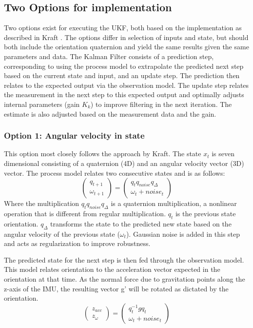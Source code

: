 \documentclass[letterpaper, 10 pt, conference]{ieeeconf}  %
\begin{document}
\subsection{Two Options for implementation}
Two options exist for executing the UKF, both based on the implementation as described in Kraft \cite{c1}. The options differ in selection of inputs and state, but should both include the orientation quaternion and yield the same results given the same parameters and data. The Kalman Filter consists of a prediction step, corresponding to using the process model to extrapolate the predicted next step based on the current state and input, and an update step. The prediction then relates to the expected output via the observation model. The update step relates the measurement in the next step to this expected output and optimally adjusts internal parameters (gain $K_k$) to improve filtering in the next iteration. The estimate is also adjusted based on the measurement data and the gain.

\subsubsection{Option 1: Angular velocity in state}
This option most closely follows the approach by Kraft. The state $x_t$ is seven dimensional consisting of a quaternion (4D) and an angular velocity vector (3D) vector. The process model relates two consecutive states and is as follows:
$$
\begin{pmatrix}
q_{t+1} \\
\omega_{t+1}
\end{pmatrix}
=
\begin{pmatrix}
q_t q_{noise} q_{\Delta} \\
\omega_t + noise_t
\end{pmatrix}
$$
Where the multiplication $q_t q_{noise} q_{\Delta}$ is a quaternion multiplication, a nonlinear operation that is different from regular multiplication. $q_t$ is the previous state orientation. $q_{\Delta}$ transforms the state to the predicted new state based on the angular velocity of the previous state ($\omega_t$). Gaussian noise is added in this step and acts as regularization to improve robustness. 

The predicted state for the next step is then fed through the observation model. This model relates orientation to the acceleration vector expected in the orientation at that time. As the normal force due to gravitation points along the z-axis of the IMU, the resulting vector g' will be rotated as dictated by the orientation. 
$$
\begin{pmatrix}
z_{acc} \\
z_{\omega}
\end{pmatrix}
=
\begin{pmatrix}
q_t^{-1} g q_t \\
\omega_t + noise_t
\end{pmatrix}
$$
\end{document}
